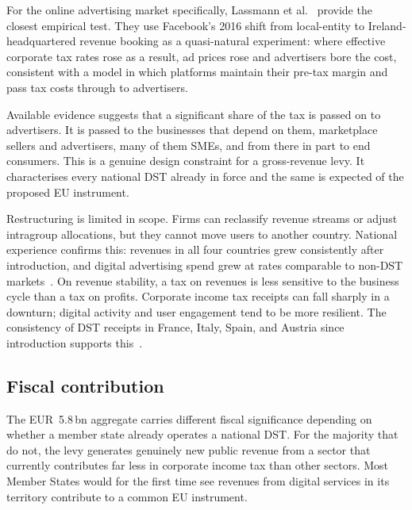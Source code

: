 \documentclass[../../main]{subfiles}
\begin{document}
For the online advertising market specifically, Lassmann et al.~\citep{lassmann_2025} provide the closest empirical test.
They use Facebook's 2016 shift from local-entity to Ireland-headquartered revenue booking as a quasi-natural experiment: where effective corporate tax rates rose as a result, ad prices rose and advertisers bore the cost, consistent with a model in which platforms maintain their pre-tax margin and pass tax costs through to advertisers.


Available evidence suggests that a significant share of the tax is passed on to advertisers.
It is passed to the businesses that depend on them, marketplace sellers and advertisers, many of them SMEs, and from there in part to end consumers.
This is a genuine design constraint for a gross-revenue levy.
It characterises every national DST already in force and the same is expected of the proposed EU instrument.

Restructuring is limited in scope.
Firms can reclassify revenue streams or adjust intragroup allocations, but they cannot move users to another country. 
National experience confirms this: revenues in all four countries grew consistently after introduction, and digital advertising spend grew at rates comparable to non-DST markets~\citep{ep_budg_digital_levy_seminar_jun2026}.
On revenue stability, a tax on revenues is less sensitive to the business cycle than a tax on profits.
Corporate income tax receipts can fall sharply in a downturn; digital activity and user engagement tend to be more resilient.
The consistency of DST receipts in France, Italy, Spain, and Austria since introduction supports this~\citep{ep_budg_digital_levy_seminar_jun2026}.


\subsection{Fiscal contribution}
\label{sec:feasibility:revenue}

The EUR~5.8\,bn aggregate carries different fiscal significance depending on whether a member state already operates a national DST.
For the majority that do not, the levy generates genuinely new public revenue from a sector that currently contributes far less in corporate income tax than other sectors.
Most Member States would for the first time see revenues from digital services in its territory contribute to a common EU instrument.
\end{document}

